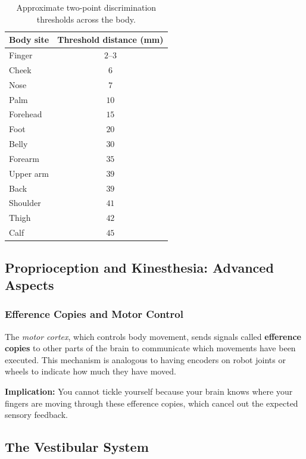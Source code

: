 \documentclass[11pt,a4paper]{article}
\theoremstyle{definition}
\theoremstyle{plain}
\theoremstyle{remark}
\begin{document}
\begin{table}[H]
    \centering
    \begin{tabular}{|l|c|}
        \hline
        \textbf{Body site} & \textbf{Threshold distance (mm)} \\
        \hline
        Finger & $2$--$3$ \\
        Cheek & $6$ \\
        Nose & $7$ \\
        Palm & $10$ \\
        Forehead & $15$ \\
        Foot & $20$ \\
        Belly & $30$ \\
        Forearm & $35$ \\
        Upper arm & $39$ \\
        Back & $39$ \\
        Shoulder & $41$ \\
        Thigh & $42$ \\
        Calf & $45$ \\
        \hline
    \end{tabular}
    \caption{Approximate two-point discrimination thresholds across the body.}
    \label{tab:two-point}

\end{table}

\subsection{Proprioception and Kinesthesia: Advanced Aspects}

\subsubsection{Efference Copies and Motor Control}

The \textit{motor cortex}, which controls body movement, sends signals called \textbf{efference copies} to other parts of the brain to communicate which movements have been executed. This mechanism is analogous to having encoders on robot joints or wheels to indicate how much they have moved.

\textbf{Implication:} You cannot tickle yourself because your brain knows where your fingers are moving through these efference copies, which cancel out the expected sensory feedback.

\subsection{The Vestibular System}
\end{document}
